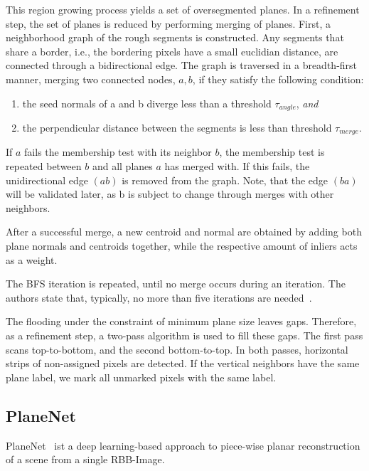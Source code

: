 \documentclass[main.tex]{subfiles}
\begin{document}
This region growing process yields a set of oversegmented planes. In a refinement step, the set of planes is reduced
by performing merging of planes.
First, a neighborhood graph of the rough segments is constructed. Any segments that share a border, i.e., the bordering
pixels have a small euclidian distance, are connected through a bidirectional edge.
The graph is traversed in a breadth-first manner, merging two connected nodes, $a,b$, if they satisfy the following condition:

\begin{enumerate}
    \item the seed normals of a and b diverge less than a threshold $\tau_{angle}$, \textit{and}
    \item the perpendicular distance between the segments is less than threshold $\tau_{merge}$.
\end{enumerate}
If $a$ fails the membership test with its neighbor $b$, the membership test is repeated between $b$ and all planes $a$
has merged with. If this fails, the unidirectional edge $(ab)$ is removed from the graph. Note, that the edge $(ba)$ will
be validated later, as b is subject to change through merges with other neighbors.

After a successful merge, a new centroid and normal are obtained by adding both plane normals and centroids together,
while the respective amount of inliers acts as a weight.

The BFS iteration is repeated, until no merge occurs during an iteration. The authors state that, typically, no more than five
iterations are needed~\cite[Section~III.E]{Roychoudhury_Missura_Bennewitz_2021_new}.

The flooding under the constraint of minimum plane size leaves gaps. Therefore, as a refinement step, a two-pass
algorithm is used to fill these gaps. The first pass scans top-to-bottom, and the second bottom-to-top.
In both passes, horizontal strips of non-assigned pixels are detected. If the vertical neighbors have the same plane label,
we mark all unmarked pixels with the same label.

\subsection{PlaneNet}
PlaneNet~\cite{Liu_Yang_Ceylan_Yumer_Furukawa_2018} ist a deep learning-based approach to piece-wise planar reconstruction of a scene from a single RBB-Image.
\end{document}
